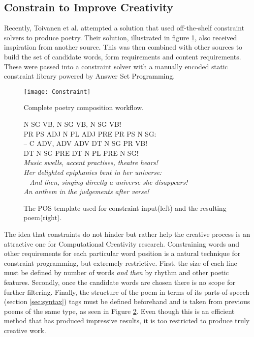 \subsection{Constrain to Improve Creativity}
\label{sec:con}
Recently, Toivanen et al. attempted a solution that used off-the-shelf constraint solvers\cite{toivanen2013harnessing} to produce poetry. Their solution, illustrated in figure \ref{fig:con1}, also received inspiration from another source. This was then combined with other sources to build the set of candidate words, form requirements and content requirements. These were passed into a constraint solver with a manually encoded static constraint library powered by Answer Set Programming.

\begin{figure}[h!]
\centering
\texttt{[image: Constraint]}
\caption{Complete poetry composition workflow.}
\label{fig:con1}
\end{figure}

\begin{figure}[h!]
\begin{multicols}{2}
N SG VB, N SG VB, N SG VB!\\
PR PS ADJ N PL ADJ PRE PR PS N SG:\\
– C ADV, ADV ADV DT N SG PR VB!\\
\columnbreak DT N SG PRE DT N PL PRE N SG!\\
\textit{Music swells, accent practises, theatre hears!\\
Her delighted epiphanies bent in her universe:\\
– And then, singing directly a universe she disappears!\\
An anthem in the judgements after verse!
}
\end{multicols}
\caption{The POS template used for constraint input(left) and the resulting poem(right).}
\label{fig:con2}
\end{figure}

The idea that constraints do not hinder but rather help the creative process is an attractive one for Computational Creativity research. Constraining words and other requirements for each particular word position is a natural technique for constraint programming, but extremely restrictive. First, the size of each line must be defined by number of words \textit{and then} by rhythm and other poetic features. Secondly, once the candidate words are chosen there is no scope for further filtering. Finally, the structure of the poem in terms of its parts-of-speech (section \ref{sec:syntax}) tags must be defined beforehand and is taken from previous poems of the same type, as seen in Figure \ref{fig:con2}. Even though this is an efficient method that has produced impressive results, it is too restricted to produce truly creative work.


